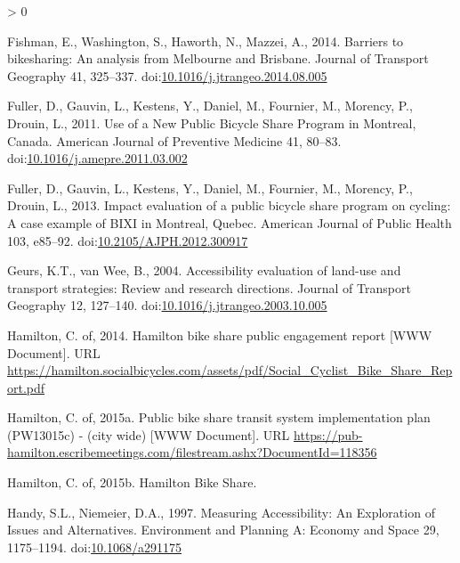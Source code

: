 \documentclass[]{elsarticle} %
\newlength{\cslhangindent}
\newenvironment{CSLReferences}[2] %
 {%
  \setlength{\parindent}{0pt}
  \ifodd #1 \everypar{\setlength{\hangindent}{\cslhangindent}}\ignorespaces\fi
  \ifnum #2 > 0
  \setlength{\parskip}{#2\baselineskip}
  \fi
 }%
 {}
\begin{document}
\begin{CSLReferences}{1}{0}
\leavevmode\hypertarget{ref-fishmanBarriersBikesharingAnalysis2014}{}%
Fishman, E., Washington, S., Haworth, N., Mazzei, A., 2014. Barriers to
bikesharing: An analysis from {Melbourne} and {Brisbane}. Journal of
Transport Geography 41, 325--337.
doi:\href{https://doi.org/10.1016/j.jtrangeo.2014.08.005}{10.1016/j.jtrangeo.2014.08.005}

\leavevmode\hypertarget{ref-fullerUseNewPublic2011}{}%
Fuller, D., Gauvin, L., Kestens, Y., Daniel, M., Fournier, M., Morency,
P., Drouin, L., 2011. Use of a {New Public Bicycle Share Program} in
{Montreal}, {Canada}. American Journal of Preventive Medicine 41,
80--83.
doi:\href{https://doi.org/10.1016/j.amepre.2011.03.002}{10.1016/j.amepre.2011.03.002}

\leavevmode\hypertarget{ref-fullerImpactEvaluationPublic2013}{}%
Fuller, D., Gauvin, L., Kestens, Y., Daniel, M., Fournier, M., Morency,
P., Drouin, L., 2013. Impact evaluation of a public bicycle share
program on cycling: A case example of {BIXI} in {Montreal}, {Quebec}.
American Journal of Public Health 103, e85--92.
doi:\href{https://doi.org/10.2105/AJPH.2012.300917}{10.2105/AJPH.2012.300917}

\leavevmode\hypertarget{ref-geursAccessibilityEvaluationLanduse2004}{}%
Geurs, K.T., van Wee, B., 2004. Accessibility evaluation of land-use and
transport strategies: Review and research directions. Journal of
Transport Geography 12, 127--140.
doi:\href{https://doi.org/10.1016/j.jtrangeo.2003.10.005}{10.1016/j.jtrangeo.2003.10.005}

\leavevmode\hypertarget{ref-hamiltonsobi2014}{}%
Hamilton, C. of, 2014. Hamilton bike share public engagement report
{[}WWW Document{]}. URL
\url{https://hamilton.socialbicycles.com/assets/pdf/Social_Cyclist_Bike_Share_Report.pdf}

\leavevmode\hypertarget{ref-hamiltonsobi2015}{}%
Hamilton, C. of, 2015a. Public bike share transit system implementation
plan (PW13015c) - (city wide) {[}WWW Document{]}. URL
\url{https://pub-hamilton.escribemeetings.com/filestream.ashx?DocumentId=118356}

\leavevmode\hypertarget{ref-hamiltonHamiltonBikeShare2015}{}%
Hamilton, C. of, 2015b. Hamilton {Bike Share}.

\leavevmode\hypertarget{ref-handyMeasuringAccessibilityExploration1997}{}%
Handy, S.L., Niemeier, D.A., 1997. Measuring {Accessibility}: {An
Exploration} of {Issues} and {Alternatives}. Environment and Planning A:
Economy and Space 29, 1175--1194.
doi:\href{https://doi.org/10.1068/a291175}{10.1068/a291175}


\end{CSLReferences}
\end{document}
